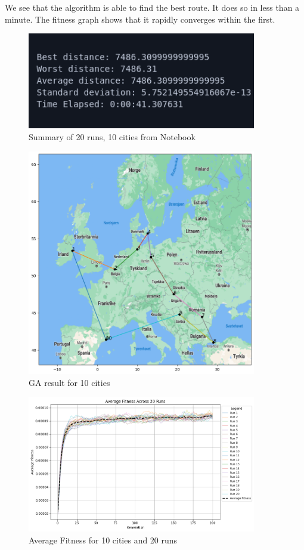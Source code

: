 \documentclass{article}
\begin{document}
    We see that the algorithm is able to find the best route. It does so in less than a minute.
    The fitness graph shows that it rapidly converges within the first.

    \begin{figure}[ht!]
        \includegraphics[width=10cm]{images/ga_10_cities_summary.png}
        \centering
        \caption{Summary of 20 runs, 10 cities from Notebook}
    \end{figure}

    \begin{figure}[ht!]
        \includegraphics[width=10cm]{images/ga_10_cities.png}
        \centering
        \caption{GA result for 10 cities}
    \end{figure}

    \begin{figure}[ht!]
        \includegraphics[width=10cm]{images/ga_10_cities_avg_graph.png}
        \centering
        \caption{Average Fitness for 10 cities and 20 runs}
    \end{figure}
\end{document}
